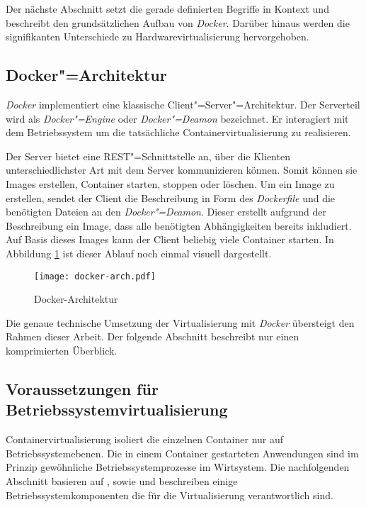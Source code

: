 Der nächste Abschnitt setzt die gerade definierten Begriffe in Kontext und beschreibt den grundsätzlichen Aufbau von \textit{Docker}. Darüber hinaus werden die signifikanten Unterschiede zu Hardwarevirtualisierung hervorgehoben.

\subsection{Docker"=Architektur}

\textit{Docker} implementiert eine klassische Client"=Server"=Architektur. Der Serverteil wird als \textit{Docker"=Engine} oder \textit{Docker"=Deamon} bezeichnet. Er interagiert mit dem Betriebssystem um die tatsächliche Containervirtualisierung zu realisieren.

Der Server bietet eine REST"=Schnittstelle an, über die Klienten unterschiedlichster Art mit dem Server kommunizieren können. Somit können sie \zB Images erstellen, Container starten, stoppen oder löschen. Um ein Image zu erstellen, sendet der Client die Beschreibung in Form des \textit{Dockerfile} und die benötigten Dateien an den \textit{Docker"=Deamon}. Dieser erstellt aufgrund der Beschreibung ein Image, dass alle benötigten Abhängigkeiten bereits inkludiert. Auf Basis dieses Images kann der Client beliebig viele Container starten. In Abbildung \ref{fig:docker-arch} ist dieser Ablauf noch einmal visuell dargestellt.

\begin{figure}[!hbt]%
\centering
\texttt{[image: docker-arch.pdf]}%
\caption{Docker-Architektur}%
\label{fig:docker-arch}%
\end{figure}

Die genaue technische Umsetzung der Virtualisierung mit \textit{Docker} übersteigt den Rahmen dieser Arbeit. Der folgende Abschnitt beschreibt nur einen komprimierten Überblick.

\subsection{Voraussetzungen für Betriebssystemvirtualisierung}

Containervirtualisierung isoliert die einzelnen Container nur auf Betriebssystemebenen. Die in einem Container gestarteten Anwendungen sind im Prinzip gewöhnliche Betriebssystemprozesse im Wirtsystem. Die nachfolgenden Abschnitt basieren auf \cite{Merkel:2014:DLL:2600239.2600241}, sowie \cite{DBLP:journals/corr/Bui15} und beschreiben einige Betriebssystemkomponenten die für die Virtualisierung verantwortlich sind.

